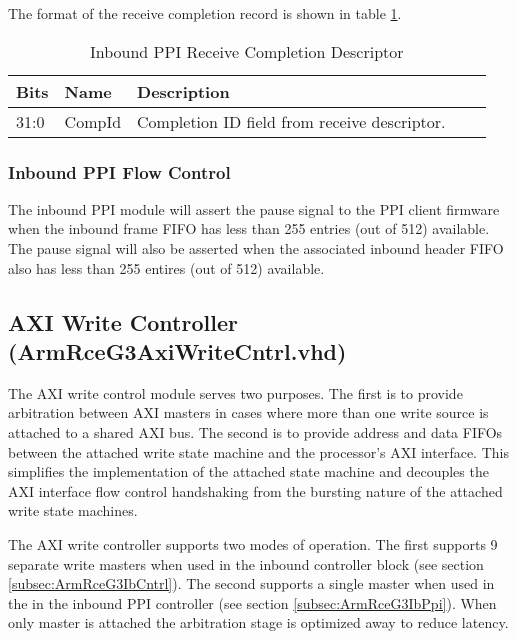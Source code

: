 \documentclass[11pt]{article}
\begin{document}
The format of the receive completion record is shown in table \ref{tab:ib_ppi_comp}.

\begin{table}[H]
\small
\centering
   \begin{tabular}{| l | l | l | l | l | } 
      \hline \textbf{Bits} & \textbf{Name} & \textbf{Description} \\
      \hline 31:0          & CompId        & Completion ID field from receive descriptor.                           \\
      \hline
   \end{tabular}
   \caption{Inbound PPI Receive Completion Descriptor}
   \label{tab:ib_ppi_comp}
\end{table}

\subsubsection{Inbound PPI Flow Control}

The inbound PPI module will assert the pause signal to the PPI client firmware when the inbound frame FIFO has less than 255 entries (out of 512)
available. The pause signal will also be asserted when the associated inbound header FIFO also has less than 255 entires (out of 512) available.

\subsection{AXI Write Controller (ArmRceG3AxiWriteCntrl.vhd)}
\label{subsec:ArmRceG3AxiWriteCntrl}

The AXI write control module serves two purposes. The first is to provide arbitration between AXI masters in cases
where more than one write source is attached to a shared AXI bus. The second is to provide address and data FIFOs 
between the attached write state machine and the processor's AXI interface. This simplifies the implementation of the 
attached state machine and decouples the AXI interface flow control handshaking from the bursting nature of the 
attached write state machines.

The AXI write controller supports two modes of operation. The first supports 9 separate write masters when
used in the inbound controller block (see section \ref{subsec:ArmRceG3IbCntrl}). The second supports a single 
master when used in the in the inbound PPI controller (see section \ref{subsec:ArmRceG3IbPpi}).
When only master is attached the arbitration stage is optimized away to reduce latency.
\end{document}
